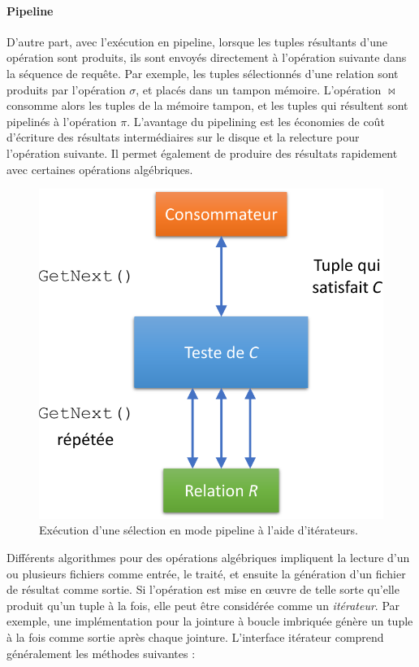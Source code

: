 \paragraph{Pipeline}
D'autre part, avec l'exécution en pipeline, lorsque les tuples résultants d'une opération sont produits, ils sont envoyés directement à l'opération suivante dans la séquence de requête. Par exemple, les tuples sélectionnés d'une relation sont produits par l'opération $\sigma$, et placés dans un tampon mémoire. L'opération $\bowtie$ consomme alors les tuples de la mémoire tampon, et les tuples qui résultent sont pipelinés à l'opération $\pi$. L'avantage du pipelining est les économies de coût d'écriture des résultats intermédiaires sur le disque et la relecture pour l'opération suivante. Il permet également de produire des résultats rapidement avec certaines opérations algébriques.

\begin{figure}
\begin{center}
\includegraphics[scale=0.55]{chapitre2/chap2Fig/pipeline-example.pdf}
\caption{Exécution d'une sélection en mode pipeline à l'aide d'itérateurs.}
 \label{fig:pipeline-example}
\end{center}
\end{figure}

Différents algorithmes pour des opérations algébriques impliquent la lecture d'un ou plusieurs fichiers comme entrée, le traité, et ensuite la génération d'un fichier de résultat comme sortie. Si l'opération est mise en œuvre de telle sorte qu'elle produit qu'un tuple à la fois, elle peut être considérée comme un \textit{itérateur}. Par exemple, une implémentation pour la jointure à boucle imbriquée génère un tuple à la fois comme sortie après chaque jointure. L'interface itérateur comprend généralement les méthodes suivantes \cite{chaudhuri04} :

